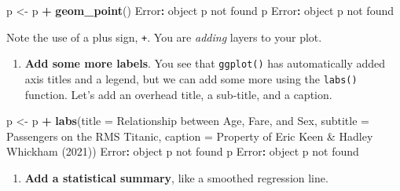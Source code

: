 \documentclass[
]{book}
\newenvironment{Shaded}{\begin{snugshade}}{\end{snugshade}}
\newcommand{\AttributeTok}[1]{\textcolor[rgb]{0.13,0.29,0.53}{#1}}
\newcommand{\FunctionTok}[1]{\textcolor[rgb]{0.13,0.29,0.53}{\textbf{#1}}}
\newcommand{\NormalTok}[1]{#1}
\newcommand{\OtherTok}[1]{\textcolor[rgb]{0.56,0.35,0.01}{#1}}
\newcommand{\SpecialCharTok}[1]{\textcolor[rgb]{0.81,0.36,0.00}{\textbf{#1}}}
\newcommand{\StringTok}[1]{\textcolor[rgb]{0.31,0.60,0.02}{#1}}
\providecommand{\tightlist}{%
  \setlength{\itemsep}{0pt}\setlength{\parskip}{0pt}}
\begin{document}
\begin{Shaded}
\begin{Highlighting}[]
\NormalTok{p }\OtherTok{\textless{}{-}}\NormalTok{ p }\SpecialCharTok{+} \FunctionTok{geom\_point}\NormalTok{()}
\NormalTok{Error}\SpecialCharTok{:}\NormalTok{ object }\StringTok{\textquotesingle{}p\textquotesingle{}}\NormalTok{ not found}
\NormalTok{p}
\NormalTok{Error}\SpecialCharTok{:}\NormalTok{ object }\StringTok{\textquotesingle{}p\textquotesingle{}}\NormalTok{ not found}
\end{Highlighting}
\end{Shaded}

Note the use of a plus sign, \texttt{+}. You are \emph{adding} layers to your plot.

\begin{enumerate}
\def\labelenumi{(\arabic{enumi})}
\setcounter{enumi}{4}
\tightlist
\item
  \textbf{Add some more labels}. You see that \texttt{ggplot()} has automatically added axis titles and a legend, but we can add some more using the \texttt{labs()} function. Let's add an overhead title, a sub-title, and a caption.
\end{enumerate}

\begin{Shaded}
\begin{Highlighting}[]
\NormalTok{p }\OtherTok{\textless{}{-}}\NormalTok{ p }\SpecialCharTok{+} \FunctionTok{labs}\NormalTok{(}\AttributeTok{title =} \StringTok{\textquotesingle{}Relationship between Age, Fare, and Sex\textquotesingle{}}\NormalTok{,}
              \AttributeTok{subtitle =} \StringTok{\textquotesingle{}Passengers on the RMS Titanic\textquotesingle{}}\NormalTok{,}
              \AttributeTok{caption =} \StringTok{\textquotesingle{}Property of Eric Keen \& Hadley Whickham (2021)\textquotesingle{}}\NormalTok{)}
\NormalTok{Error}\SpecialCharTok{:}\NormalTok{ object }\StringTok{\textquotesingle{}p\textquotesingle{}}\NormalTok{ not found}
\NormalTok{p}
\NormalTok{Error}\SpecialCharTok{:}\NormalTok{ object }\StringTok{\textquotesingle{}p\textquotesingle{}}\NormalTok{ not found}
\end{Highlighting}
\end{Shaded}

\begin{enumerate}
\def\labelenumi{(\arabic{enumi})}
\setcounter{enumi}{5}
\tightlist
\item
  \textbf{Add a statistical summary}, like a smoothed regression line.
\end{enumerate}
\end{document}
